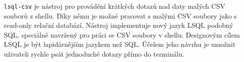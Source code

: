 \documentclass[a4paper]{article}
\def\icode#1{\texttt{#1}}
\begin{document}
\icode{lsql-csv} je nástroj pro provádění krátkých dotazů nad daty malých CSV souborů z shellu. 
Díky němu je možné pracovat s malými CSV soubory jako s read-only relační databází.
Nástroj implementuje nový jazyk LSQL podobný SQL, speciálně navržený pro práci se CSV soubory v shellu.
Designovým cílem LSQL je být lapidárnějším jazykem než SQL.
Účelem jeho návrhu je umožnit uživateli rychle psát jednoduché dotazy přímo do terminálu.
\end{document}
